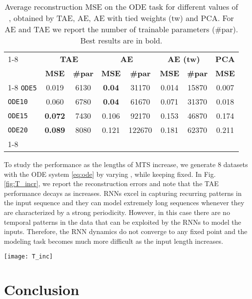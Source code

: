 \documentclass[a4paper,10pt,pdftex]{article}
\begin{document}
\def\arraystretch{0.95} \setlength\tabcolsep{.35em} \begin{table}[!ht]
\footnotesize
\centering
\caption{Average reconstruction MSE on the ODE task for different values of , obtained by TAE, AE, AE with tied weights (tw) and PCA. For AE and TAE we report the number of trainable parameters (\#par). Best results are in bold.}
\label{tab:ODE}
\begin{tabular}{l|cc|cc|cc|c}
\cmidrule[1.5pt]{1-8}
\multirow{ 2}{*}{\textbf{Dataset}} & \multicolumn{2}{c|}{\textbf{TAE}} & \multicolumn{2}{c|}{\textbf{AE}} & \multicolumn{2}{c|}{\textbf{AE (tw)}} & \textbf{PCA} \\
& \textbf{MSE} & \textbf{\#par} & \textbf{MSE} & \textbf{\#par} & \textbf{MSE} & \textbf{\#par} & \textbf{MSE} \\
\cmidrule[.5pt]{1-8}
\texttt{ODE5}  & 0.019 & 6130 & \textbf{0.04} & 31170  & 0.014 & 15870 & 0.007  \\
\texttt{ODE10} & 0.060 & 6780 & \textbf{0.04}  & 61670  & 0.071 & 31370 & 0.018  \\
\texttt{ODE15} & \textbf{0.072} & 7430 & 0.106 & 92170  & 0.153 & 46870 & 0.174  \\
\texttt{ODE20} & \textbf{0.089} & 8080 & 0.121 & 122670 & 0.181 & 62370 & 0.211  \\
\cmidrule[1.5pt]{1-8}
\end{tabular}
\end{table}
\egroup

To study the performance as the lengths of MTS increase, we generate 8 datasets with the ODE system \eqref{eq:ode} by varying , while keeping  fixed.
In Fig. \ref{fig:T_incr}, we report the reconstruction errors and note that the TAE performance decays as  increases.
RNNs excel in capturing recurring patterns in the input sequence and they can model extremely long sequences whenever they are characterized by a strong periodicity.
However, in this case there are no temporal patterns in the data that can be exploited by the RNNs to model the inputs. 
Therefore, the RNN dynamics do not converge to any fixed point and the modeling task becomes much more difficult as the input length increases.
\begin{SCfigure}[0.8][th!]
\centering
\texttt{[image: T\_inc]}	
\caption{Reconstruction MSE when increasing length  of MTS in \texttt{ODE15}. TAE performance decreases for large .}
\label{fig:T_incr}
\end{SCfigure}

\section{Conclusion}
\label{sec:conclusion}
\end{document}
